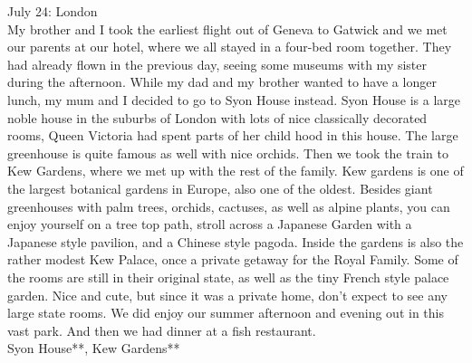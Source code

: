 July 24: London\\
My brother and I took the earliest flight out of Geneva to Gatwick and we met our parents at our hotel, where we all stayed in a four-bed room together. They had already flown in the previous day, seeing some museums with my sister during the afternoon. While my dad and my brother wanted to have a longer lunch, my mum and I decided to go to Syon House instead. Syon House is a large noble house in the suburbs of London with lots of nice classically decorated rooms, Queen Victoria had spent parts of her child hood in this house. The large greenhouse is quite famous as well with nice orchids. Then we took the train to Kew Gardens, where we met up with the rest of the family. Kew gardens is one of the largest botanical gardens in Europe, also one of the oldest. Besides giant greenhouses with palm trees, orchids, cactuses, as well as alpine plants, you can enjoy yourself on a tree top path, stroll across a Japanese Garden with a Japanese style pavilion, and a Chinese style pagoda. Inside the gardens is also the rather modest Kew Palace, once a private getaway for the Royal Family. Some of the rooms are still in their original state, as well as the tiny French style palace garden. Nice and cute, but since it was a private home, don't expect to see any large state rooms. We did enjoy our summer afternoon and evening out in this vast park. And then we had dinner at a fish restaurant.\\

Syon House**, Kew Gardens**\\

